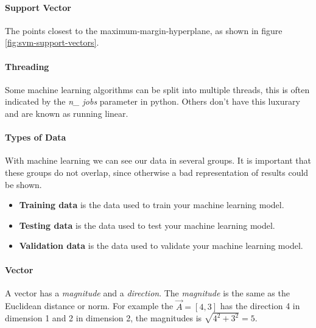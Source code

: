 \paragraph{Support Vector}
The points closest to the maximum-margin-hyperplane, as shown in figure \ref{fig:svm-support-vectors}.

\paragraph{Threading} 
Some machine learning algorithms can be split into multiple threads, this is often indicated by the \emph{n\_ jobs} parameter in python. Others don't have this luxurary and are known as running linear.

\paragraph{Types of Data} 
With machine learning we can see our data in several groups. It is important that these groups do not overlap, since otherwise a bad representation of results could be shown.
\begin{itemize}
	\item \textbf{Training data} is the data used to train your machine learning model.
	\item \textbf{Testing data} is the data used to test your machine learning model.
	\item \textbf{Validation data} is the data used to validate your machine learning model.
\end{itemize}

\paragraph{Vector}
A vector has a \emph{magnitude} and a \emph{direction}. The \emph{magnitude} is the same as the Euclidean distance or norm. For example the $\vec{A} = [4, 3]$ has the direction 4 in dimension 1 and 2 in dimension 2, the magnitudes is $\sqrt{4^2 + 3^2} = 5$. 


 
